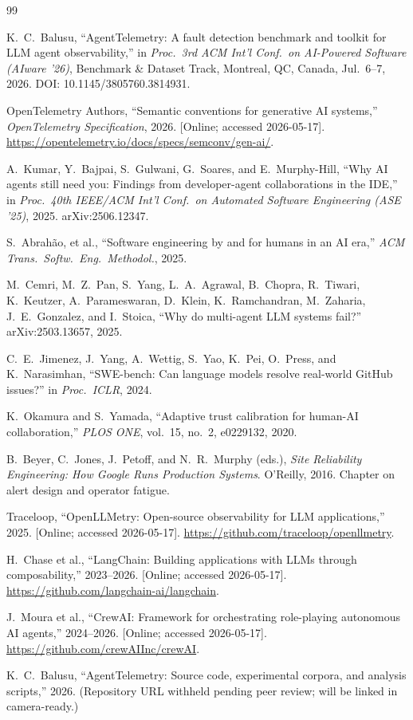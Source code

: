\documentclass[journal]{IEEEtran}
\begin{document}
\begin{thebibliography}{99}

K.~C.~Balusu, ``AgentTelemetry: A fault detection benchmark and toolkit for LLM agent observability,'' in \emph{Proc.\ 3rd ACM Int'l Conf.\ on AI-Powered Software (AIware '26)}, Benchmark \& Dataset Track, Montreal, QC, Canada, Jul.\ 6--7, 2026. DOI: 10.1145/3805760.3814931.

{OpenTelemetry Authors}, ``Semantic conventions for generative AI systems,'' \emph{OpenTelemetry Specification}, 2026. [Online; accessed 2026-05-17]. \url{https://opentelemetry.io/docs/specs/semconv/gen-ai/}.

A.~Kumar, Y.~Bajpai, S.~Gulwani, G.~Soares, and E.~Murphy-Hill, ``Why AI agents still need you: Findings from developer-agent collaborations in the IDE,'' in \emph{Proc.\ 40th IEEE/ACM Int'l Conf.\ on Automated Software Engineering (ASE '25)}, 2025. arXiv:2506.12347.

S.~Abrah\~{a}o, et al., ``Software engineering by and for humans in an AI era,'' \emph{ACM Trans.\ Softw.\ Eng.\ Methodol.}, 2025.

M.~Cemri, M.~Z.~Pan, S.~Yang, L.~A.~Agrawal, B.~Chopra, R.~Tiwari, K.~Keutzer, A.~Parameswaran, D.~Klein, K.~Ramchandran, M.~Zaharia, J.~E.~Gonzalez, and I.~Stoica, ``Why do multi-agent LLM systems fail?'' arXiv:2503.13657, 2025.

C.~E.~Jimenez, J.~Yang, A.~Wettig, S.~Yao, K.~Pei, O.~Press, and K.~Narasimhan, ``SWE-bench: Can language models resolve real-world GitHub issues?'' in \emph{Proc.\ ICLR}, 2024.

K.~Okamura and S.~Yamada, ``Adaptive trust calibration for human-AI collaboration,'' \emph{PLOS ONE}, vol.\ 15, no.\ 2, e0229132, 2020.

B.~Beyer, C.~Jones, J.~Petoff, and N.~R.~Murphy (eds.), \emph{Site Reliability Engineering: How Google Runs Production Systems}. O'Reilly, 2016. Chapter on alert design and operator fatigue.

{Traceloop}, ``OpenLLMetry: Open-source observability for LLM applications,'' 2025. [Online; accessed 2026-05-17]. \url{https://github.com/traceloop/openllmetry}.

H.~Chase et al., ``LangChain: Building applications with LLMs through composability,'' 2023--2026. [Online; accessed 2026-05-17]. \url{https://github.com/langchain-ai/langchain}.

J.~Moura et al., ``CrewAI: Framework for orchestrating role-playing autonomous AI agents,'' 2024--2026. [Online; accessed 2026-05-17]. \url{https://github.com/crewAIInc/crewAI}.

K.~C.~Balusu, ``AgentTelemetry: Source code, experimental corpora, and analysis scripts,'' 2026. (Repository URL withheld pending peer review; will be linked in camera-ready.)

\end{thebibliography}
\end{document}
